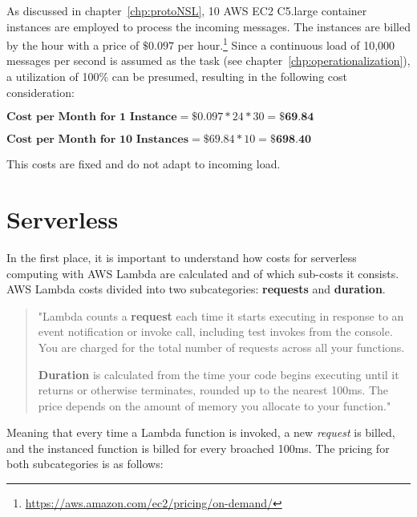 As discussed in chapter~\vref{chp:protoNSL}, 10 AWS EC2 C5.large container instances are employed to process the incoming messages. The instances are billed by the hour with a price of $\$0.097$ per hour.\footnote{\url{https://aws.amazon.com/ec2/pricing/on-demand/}} Since a continuous load of 10,000 messages per second is assumed as the task (see chapter~\vref{chp:operationalization}), a utilization of 100\% can be presumed, resulting in the following cost consideration:

$\textbf{Cost per Month for 1 Instance} = \$0.097 * 24 * 30 = \textbf{\$69.84}$

$\textbf{Cost per Month for 10 Instances} = \$69.84 * 10 = \textbf{\$698.40}$

This costs are fixed and do not adapt to incoming load. 

\section{Serverless}\label{chp:viaSL}

In the first place, it is important to understand how costs for serverless computing with AWS Lambda are calculated and of which sub-costs it consists. AWS Lambda costs divided into two subcategories: \textbf{requests} and \textbf{duration}. 

\blockquote{
    "Lambda counts a \textbf{request} each time it starts executing in response to an event notification or invoke call, including test invokes from the console. You are charged for the total number of requests across all your functions.  
    
    \textbf{Duration} is calculated from the time your code begins executing until it returns or otherwise terminates, rounded up to the nearest 100ms. The price depends on the amount of memory you allocate to  your function."\autocite{AWSPricing}
}

Meaning that every time a Lambda function is invoked, a new \textit{request} is billed, and the instanced function is billed for every broached 100ms. The pricing for both subcategories is as follows: 

